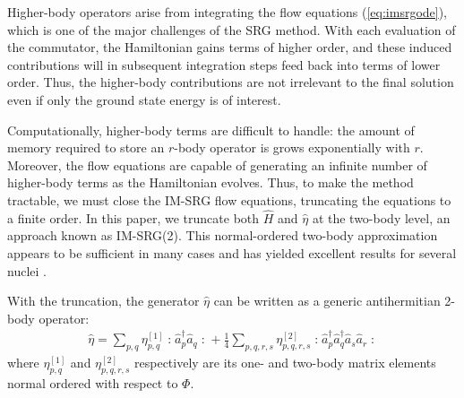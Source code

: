 \documentclass[amsmath, amssymb, aps, floatfix, nofootinbib, preprintnumbers,showpacs, superscriptaddress, twocolumn]{revtex4-1}
\newcommand{\normord}[1]{\mathopen: #1 \mathclose:}
\begin{document}
Higher-body operators arise from integrating the flow equations (\ref{eq:imsrgode}), which is one of the major challenges of the SRG method.  With each evaluation of the commutator, the Hamiltonian gains terms of higher order, and these induced contributions will in subsequent integration steps feed back into terms of lower order.  Thus, the higher-body contributions are not irrelevant to the final solution even if only the ground state energy is of interest.

Computationally, higher-body terms are difficult to handle: the amount of memory required to store an $r$-body operator is grows exponentially with $r$.  Moreover, the flow equations are capable of generating an infinite number of higher-body terms as the Hamiltonian evolves.  Thus, to make the method tractable, we must close the IM-SRG flow equations, truncating the equations to a finite order.  In this paper, we truncate both $\hat{H}$ and $\hat{\eta}$ at the two-body level, an approach known as IM-SRG(2).  This normal-ordered two-body approximation appears to be sufficient in many cases and has yielded excellent results for several nuclei \cite{PhysRevLett.106.222502,PhysRevLett.109.052501,IMSRG}.

With the truncation, the generator $\hat{\eta}$ can be written as a generic antihermitian 2-body operator:
\begin{align*}
\hat{\eta} = \sum_{p, q} \eta_{p, q}^{[1]} \normord{\hat a_p^\dagger \hat a_q} +
\frac{1}{4} \sum_{p, q, r, s}\eta_{p, q, r, s}^{[2]} \normord{\hat a_p^\dagger \hat a_q^\dagger \hat a_s \hat a_r}
\end{align*}
where $\eta_{p, q}^{[1]}$ and $ \eta_{p, q, r, s}^{[2]}$ respectively are its one- and two-body matrix elements normal ordered with respect to $\Phi$.
\end{document}
